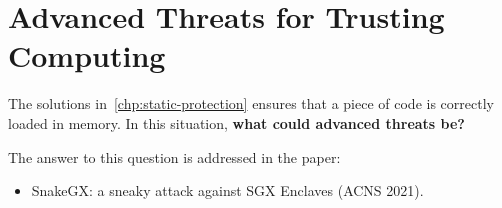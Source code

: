 \chapter{Advanced Threats for Trusting Computing}
\label{chp:advanced-threats} 

The solutions in~\ref{chp:static-protection} ensures that a piece of code is
correctly loaded in memory. 
In this situation, \textbf{what could advanced threats be?}


The answer to this question is addressed in the paper:
\begin{itemize}
	\item SnakeGX: a sneaky attack against SGX Enclaves (ACNS 2021).
\end{itemize}